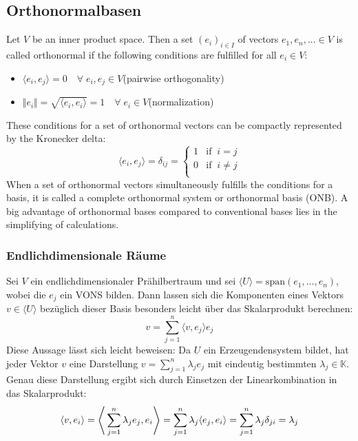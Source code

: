 \documentclass[9pt]{report}
\begin{document}
\subsection{Orthonormalbasen}
Let $V$ be an inner product space. Then a set $(e_i)_{i\in I}$ of vectors $e_1,e_n,...\in V$ is called orthonormal if the following conditions are fulfilled for all $e_i\in V$:
\begin{itemize}
\item $\langle e_i,e_j\rangle =0\quad\forall\;e_i,e_j\in V$\quad (pairwise orthogonality)
\item $\Vert e_i\Vert =\sqrt{\langle e_i,e_i\rangle}=1\quad\forall\;e_i\in V$\quad (normalization)
\end{itemize}
These conditions for a set of orthonormal vectors can be compactly represented by the Kronecker delta: 
\begin{equation}
\langle e_i,e_j\rangle =\delta_{ij}=\left\{\begin{array}{cc} 1 & \textrm{if}\;\; i=j\\
0 & \textrm{if}\;\; i\neq j\\ \end{array}\right.
\end{equation}
When a set of orthonormal vectors simultaneously fulfills the conditions for a basis, it is called a complete orthonormal system or orthonormal basis (ONB). A big advantage of orthonormal bases compared to conventional bases lies in the simplifying of calculations.


\subsubsection{Endlichdimensionale Räume}
Sei $V$ ein endlichdimensionaler Prähilbertraum und sei $\langle U\rangle=\mathrm{span}(e_1,...,e_n)$, wobei die $e_j$ ein VONS bilden. Dann lassen sich die Komponenten eines Vektors $v\in \langle U\rangle$ bezüglich dieser Basis besonders leicht über das Skalarprodukt berechnen:
\begin{equation}
v=\sum_{j=1}^{n}\langle v,e_j\rangle e_j
\end{equation}
Diese Aussage lässt sich leicht beweisen: Da $U$ ein Erzeugendensystem bildet, hat jeder Vektor $v$ eine Darstellung $v=\sum_{j=1}^{n}\lambda_{j}e_{j}$ mit eindeutig bestimmten $\lambda_j\in\mathbb{K}$. Genau diese Darstellung ergibt sich durch Einsetzen der Linearkombination in das Skalarprodukt:
\begin{equation}
\langle v,e_i\rangle =\Bigg\langle\sum_{j=1}^{n}\lambda_{j}e_{j},e_{i}\Bigg\rangle =\sum_{j=1}^{n}\lambda_{j}\langle e_j,e_i\rangle =\sum_{j=1}^{n}\lambda_{j}\delta_{ji}=\lambda_j\notag
\end{equation}
\end{document}
